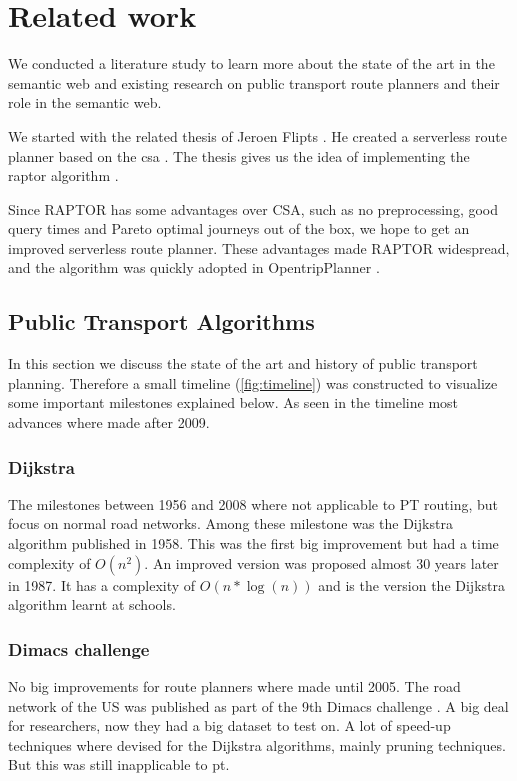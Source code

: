 \chapter{Related work}
\label{chap:rel_work}

We conducted a literature study to learn more about the state of the art in the semantic web and existing research on public transport route planners and their role in the semantic web.

We started with the related thesis of Jeroen Flipts \cite{flipts_fragmenting_2020}. He created a serverless route planner based on the \acrfull{csa} \cite{dibbelt_intriguingly_2013}. The thesis gives us the idea of implementing the \acrfull{raptor} algorithm \cite{delling_round-based_2015}.

Since RAPTOR has some advantages over CSA, such as no preprocessing, good query times and Pareto optimal journeys out of the box, we hope to get an improved serverless route planner. These advantages made RAPTOR widespread, and the algorithm was quickly adopted in OpentripPlanner \cite{noauthor_otp_2023}.

\section{Public Transport Algorithms}



In this section we discuss the state of the art and history of public transport planning. Therefore a small timeline (\autoref{fig:timeline}) was constructed to visualize some important milestones explained below. As seen in the timeline most advances where made after 2009.

\subsection{Dijkstra}
The milestones between 1956 and 2008 where not applicable to PT routing, but focus on normal road networks. Among these milestone was the Dijkstra algorithm published in 1958. This was the first big improvement but had a time complexity of $O(n^2)$. An improved version was proposed almost 30 years later in 1987. It has a complexity of $O(n*\log(n))$ and is the version the Dijkstra algorithm learnt at schools.%
\subsection{Dimacs challenge}
No big improvements for route planners where made until 2005. The road network of the US was published as part of the 9th Dimacs challenge \cite{noauthor_9th_2017}. A big deal for researchers, now they had a big dataset to test on. A lot of speed-up techniques where devised for the Dijkstra algorithms, mainly pruning techniques. But this was still inapplicable to \acrshort{pt}.

